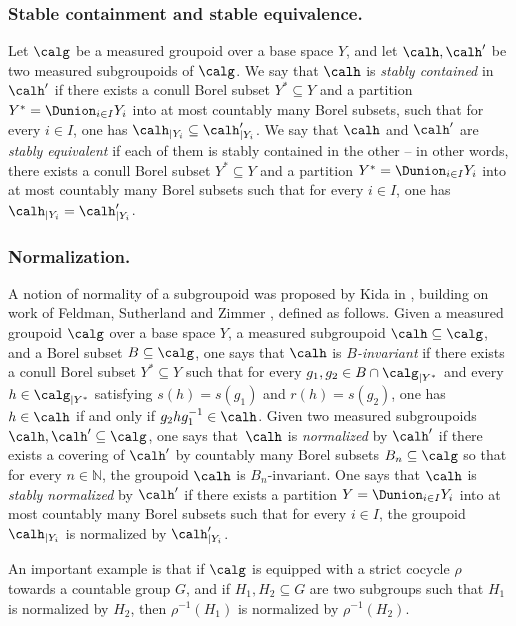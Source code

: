 \subsubsection*{Stable containment and stable equivalence.} Let $\calg$ be a measured groupoid over a base space $Y$, and let $\calh,\calh'$ be two measured subgroupoids of $\calg$. We say that $\calh$ is \emph{stably contained} in $\calh'$ if there exists a conull Borel subset $Y^*\subseteq Y$ and a partition $Y^*=\Dunion_{i\in I}Y_i$ into at most countably many Borel subsets, such that for every $i\in I$, one has $\calh_{|Y_i}\subseteq\calh'_{|Y_i}$. We say that $\calh$ and $\calh'$ are \emph{stably equivalent} if each of them is stably contained in the other -- in other words, there exists a conull Borel subset $Y^*\subseteq Y$ and a partition $Y^*=\Dunion_{i\in I}Y_i$ into at most countably many Borel subsets such that for every $i\in I$, one has $\calh_{|Y_i}=\calh'_{|Y_i}$.

\subsubsection*{Normalization.}

A notion of normality of a subgroupoid was proposed by Kida in \cite[Chap.\,4, \S6.1]{Kid-memoir}, building on work of Feldman, Sutherland and Zimmer \cite{FSZ}, defined as follows. Given a measured groupoid $\calg$ over a base space $Y$, a measured subgroupoid $\calh\subseteq\calg$, and a Borel subset $B\subseteq\calg$, one says that $\calh$ is \emph{$B$-invariant} if there exists a conull Borel subset $Y^*\subseteq Y$ such that for every $g_1,g_2\in B\cap\calg_{|Y^*}$ and every $h\in\calg_{|Y^*}$ satisfying $s(h)=s(g_1)$ and $r(h)=s(g_2)$, one has $h\in\calh$ if and only if $g_2hg_1^{-1}\in\calh$. Given two measured subgroupoids $\calh,\calh'\subseteq\calg$, one says that~$\calh$ is \emph{normalized} by $\calh'$ if there exists a covering of $\calh'$ by countably many Borel subsets $B_n\subseteq\calg$ so that for every $n\in\mathbb{N}$, the groupoid $\calh$ is $B_n$-invariant. One says that $\calh$ is \emph{stably normalized} by $\calh'$ if there exists a partition $Y=\Dunion_{i\in I}Y_i$ into at most countably many Borel subsets such that for every $i\in I$, the groupoid $\calh_{|Y_i}$ is normalized by $\calh'_{|Y_i}$.

An important example is that if $\calg$ is equipped with a strict cocycle $\rho$ towards a countable group $G$, and if $H_1,H_2\subseteq G$ are two subgroups such that $H_1$ is normalized by $H_2$, then $\rho^{-1}(H_1)$ is normalized by $\rho^{-1}(H_2)$.

